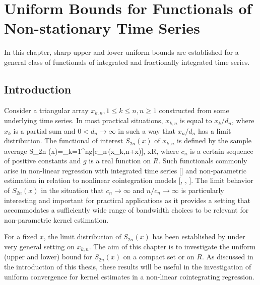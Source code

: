 
\chapter{Uniform Bounds for Functionals of Non-stationary Time Series}
\ifpdf
    \graphicspath{{Chapter2/Chapter2Figs/PNG/}{Chapter2/Chapter2Figs/PDF/}{Chapter2/Chapter2Figs/}}
\else
    \graphicspath{{Chapter2/Chapter2Figs/EPS/}{Chapter2/Chapter2Figs/}}
\fi

In this chapter, sharp upper and lower uniform bounds are established for a general class of functionals of integrated and fractionally integrated time series.  

\section{Introduction}
Consider a triangular array ${x_{k,n},1\leq k\leq n,n\geq
1}$ constructed from some underlying time series.
In most practical situations, $x_{k,n}$ is equal to $x_k/d_n$, where $x_k$
is a partial sum and $0 < d_n\to \infty$ in such a way that $x_n/d_n$ has a limit distribution.  The functional of interest $
S_{2n}(x)$ of $x_{k,n}$ is defined by the sample average
\bestar
S_{2n} (x)=\sum_{k=1}^{n}g[c_{n}\,(x_{k,n}+x)], \quad x\in R,
\eestar
where $c_{n}$ is a certain sequence of positive constants and $g$ is
a real function on $R$. Such functionals commonly arise in
non-linear regression with integrated time series [\citet[][\citeyear{parkphillips2001}]{parkphillips1999}] and non-parametric estimation in relation to nonlinear cointegration models [\cite{phillipspark1998}, \cite{karlsentjostheim2001}, \citet[][\citeyear{wangphillips2010a}, \citeyear{wangphillips2010b}]{wangphillips2009}]. The limit
behavior of $S_{2n}(x)$ in the situation that $c_{n}\rightarrow \infty $ and $%
n/c_{n}\rightarrow \infty $ is particularly interesting and
important for practical applications as it provides a setting that
accommodates a sufficiently wide range of bandwidth choices to be
relevant for non-parametric kernel estimation.

For a fixed $x$, the limit distribution of $S_{2n}(x)$ has been established by \citet[][\citeyear{wangphillips2010a}, \citeyear{wangphillips2010b}]{wangphillips2009} under very general setting on $x_{k,n}$. The aim of this chapter is to investigate the uniform (upper and lower) bound  for $S_{2n}(x)$ on a compact set or on $R$. As discussed in the introduction of this thesis, these results will be useful in the investigation of uniform convergence for kernel estimates in a non-linear cointegrating regression.

